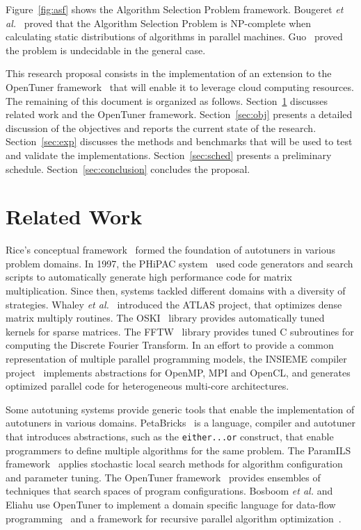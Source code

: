 \documentclass[a4paper, 12pt]{article}
\begin{document}
Figure~\ref{fig:asf} shows the Algorithm Selection Problem framework.
Bougeret \emph{et al.}~\cite{bougeret2009combining} proved that the Algorithm
Selection Problem is NP-complete when calculating static distributions of
algorithms in parallel machines.  Guo~\cite{guo2003algorithm} proved the
problem is undecidable in the general case.

This research proposal consists in the implementation of an
extension to the OpenTuner framework~\cite{ansel2014opentuner} that will
enable it to leverage cloud computing resources.
The remaining of this document is organized as follows.
Section~\ref{sec:related} discusses related work and the OpenTuner
framework.
Section~\ref{sec:obj} presents a detailed discussion of the objectives
and reports the current state of the research.
Section~\ref{sec:exp} discusses the methods and benchmarks that will be used to
test and validate the implementations.
Section~\ref{sec:sched} presents a preliminary schedule.
Section~\ref{sec:conclusion} concludes the proposal.

\section{Related Work} \label{sec:related}

Rice's conceptual framework~\cite{rice1976algorithm} formed the foundation
of autotuners in various problem domains.  In 1997, the PHiPAC
system~\cite{bilmes1997phipac} used code generators and search scripts to
automatically generate high performance code
for matrix multiplication. Since then, systems tackled different domains with a
diversity of strategies. Whaley \emph{et al.}~\cite{whaley1998atlas} introduced
the ATLAS project, that optimizes dense matrix multiply routines. The
OSKI~\cite{vuduc2005oski} library provides automatically tuned kernels for
sparse matrices. The FFTW~\cite{frigo1998fftw} library provides tuned C
subroutines for computing the Discrete Fourier Transform.  In an effort to
provide a common representation of multiple parallel programming models, the
INSIEME compiler project~\cite{jordan2012multi} implements abstractions for
OpenMP, MPI and OpenCL, and generates optimized parallel code for heterogeneous
multi-core architectures.

Some autotuning systems provide generic tools that enable the implementation of
autotuners in various domains. PetaBricks~\cite{ansel2009petabricks} is a
language, compiler and autotuner that introduces abstractions, such as the
\texttt{\footnotesize either...or} construct, that enable programmers to define
multiple algorithms for the same problem.  The ParamILS
framework~\cite{hutter2009paramils} applies stochastic local search methods
for algorithm configuration and parameter tuning.  The OpenTuner
framework~\cite{ansel2014opentuner} provides ensembles of techniques that
search spaces of program configurations. Bosboom \emph{et al.} and Eliahu use
OpenTuner to implement a domain specific language for data-flow
programming~\cite{bosboom2014streamjit} and a framework for recursive parallel
algorithm optimization~\cite{eliahu2015frpa}.
\end{document}
